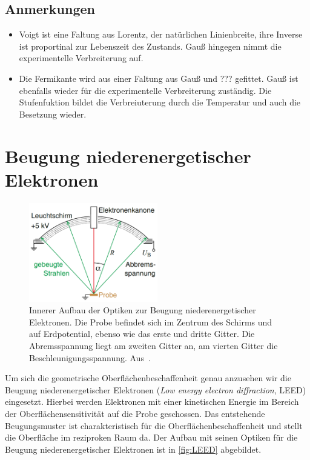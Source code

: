             \subsection{Anmerkungen}
            \begin{itemize}
                \item Voigt ist eine Faltung aus Lorentz, der natürlichen Linienbreite, ihre Inverse ist proportinal zur Lebenszeit des Zustands. Gauß hingegen nimmt die experimentelle Verbreiterung auf.
                \item Die Fermikante wird aus einer Faltung aus Gauß und ??? gefittet. Gauß ist ebenfalls wieder für die experimentelle Verbreiterung zuständig. Die Stufenfuktion bildet die Verbreiuterung durch die Temperatur und auch die Besetzung wieder.
            \end{itemize}
         

    \section{Beugung niederenergetischer Elektronen} \label{sec:LEED}
        \begin{figure}
            \centering
            \includegraphics[width=0.5\textwidth]{LEED}
            \caption{Innerer Aufbau der Optiken zur Beugung niederenergetischer Elektronen.
            Die Probe befindet sich im Zentrum des Schirms und auf Erdpotential, ebenso wie das erste und dritte Gitter.
            Die Abremsspannung liegt am zweiten Gitter an, am vierten Gitter die Beschleunigungsspannung.
            Aus~\cite{Fauster}.}
            \label{fig:LEED}
        \end{figure}
        Um sich die geometrische Oberflächenbeschaffenheit genau anzusehen wir die Beugung niederenergetischer Elektronen (\textit{Low energy electron diffraction}, LEED) eingesetzt.
        Hierbei werden Elektronen mit einer kinetischen Energie im Bereich der Oberflächensensitivität auf die Probe geschossen.
        Das entstehende Beugungsmuster ist charakteristisch für die Oberflächenbeschaffenheit und stellt die Oberfläche im reziproken Raum da.
        Der Aufbau mit seinen Optiken für die Beugung niederenergetischer Elektronen ist in \autoref{fig:LEED} abgebildet.
        
